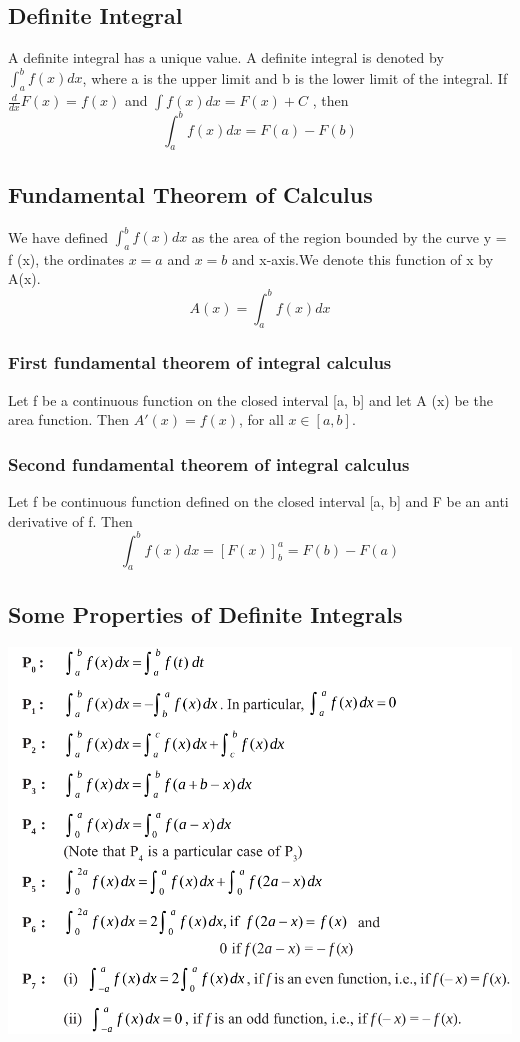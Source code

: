 \documentclass[12pt]{article}
\begin{document}
    \subsection*{Definite Integral}
    A definite integral has a unique value. A definite integral is denoted by $\int_a^b f(x) dx$, where a is the upper limit and b is the lower limit of the integral. If $\frac{d}{dx} F(x)=f(x)$ and $\int f(x)dx = F(x) + C$ , then $$ \int_a^b f(x) dx= F(a)-F(b)$$


    \subsection*{Fundamental Theorem of Calculus}
    We have defined $\int_a^b f(x) dx$ as the area of  the region bounded by the curve y = f (x),
the ordinates $x = a$ and $x = b$ and x-axis.We denote this
function of x by A(x).$$A(x)=\int_a^b f(x) dx$$

\subsubsection*{First fundamental theorem of integral calculus}
Let f be a continuous function on the closed interval [a, b] and let A (x) be
the area function. Then $A'(x) = f (x)$, for all $x \in [a, b].$

\subsubsection*{Second fundamental theorem of integral calculus}
Let f be continuous function defined on the closed interval [a, b] and F be
an anti derivative of f. Then $$\int_a^b f(x) dx = [F(x)]_b^a =F(b)-F(a) $$


\subsection*{Some Properties of Definite Integrals}
\begin{center}
    \includegraphics*[scale=0.5]{41.png}
\end{center}
\end{document}

